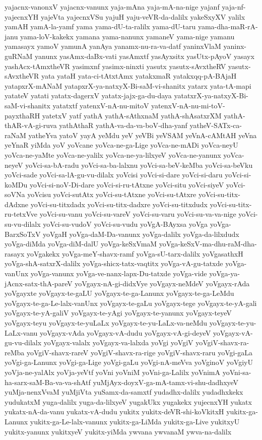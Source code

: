 {yajacnx-vanonxV
yajacnx-vanunx
yaja-mAna
yaja-mA-na-nige
yajanf
yaja-nf-yajecnxYH
yajeVta
yajecnxVSu
yajuH
yaju-veVR-da-dalilx
yakeSxyXV
yalilx
yamAH
yamA-la-yamf
yama
yama-dU-ta-ralilx
yama-dU-taru
yama-dha-maR-rA-janu
yama-loV-kakekx
yamana
yama-nanunx
yamaneV
yama-nige
yamanu
yamasayx
yamoV
yamunA
yanAya
yanamx-nu-ra-va-datf
yaninxVlaM
yaninx-guRNaM
yanunx
yasAmx-daBx-vati
yasAmxtf
yasAyxsitx
yasUtx-pAyoV
yasayx
yashAcx-tAmxtheVR
yasimxnf
yasimx-ninxti
yasutx
yasutx-sAvxtheRV
yasutx-sAvxtheVR
yata
yataH
yata-ci-tAtxtAmx
yatakxmaR
yatakxqq-pA-BAjaH
yatapxrX-mANaM
yatapxrX-ya-natxyX-Bi-saM-vi-shanitx
yatarx
yata-tA-mapi
yatateV
yatati
yatatx-dagerxV
yatatx-jajx-ga-du-daya
yatatxrX-ya-natxyX-Bi-saM-vi-shanitx
yatatxtf
yatenxV-nA-nu-mitoV
yatenxV-nA-nu-mi-toV-payxthaRH
yatetxV
yatf
yathA
yathA-sAthxnaM
yathA-shAsatxrXM
yathA-thAR-vA-gi-ruva
yathAthaR
yathA-va-da-va-boV-dha-yanf
yatheV-SATx-ca-raNaM
yatheYva
yatoV
yayA
yeMdu
yeV
yeVBi
yeVSAM
yeVnA-cAMtAH
yeVna
yeYnaR
yiMda
yoV
yoVcane
yoVca-ne-ga-Lige
yoVca-ne-mADi
yoVca-neyU
yoVca-ne-yaMte
yoVca-ne-yalilx
yoVca-ne-ya-lilxyeV
yoVca-ne-yanunx
yoVca-neyeV
yoVci-sa-bA-radu
yoVci-sa-ba-lalxnu
yoVci-sa-beV-keMba
yoVci-sa-beVku
yoVci-sade
yoVci-sa-lA-gu-vu-dilalx
yoVcisi
yoVci-si-dare
yoVci-si-daru
yoVci-si-koMDu
yoVci-si-noV-Di-dare
yoVci-si-ru-tAtxne
yoVci-situ
yoVci-siyeV
yoVci-soVNa
yoVcisu
yoVci-sutAtx
yoVci-su-tAtxne
yoVci-su-tAtxre
yoVci-su-titx-dAdxne
yoVci-su-titxdadx
yoVci-su-titx-dadxre
yoVci-su-titxdudx
yoVci-su-titx-ru-tetxVve
yoVci-su-vanu
yoVci-su-vareV
yoVci-su-varu
yoVci-su-va-va-nige
yoVci-su-vu-dilalx
yoVci-su-vudoV
yoVci-su-vudu
yoVgA-BAyxsa
yoVga
yoVga-BarxSoTxV
yoVgaH
yoVga-daM-Da-vanunx
yoVga-dalilx
yoVga-da-lilxdudx
yoVga-diMda
yoVga-diM-dalU
yoVga-keSxVmaM
yoVga-keSxV-ma-dhu-raM-dha-rasayx
yoVgakekx
yoVga-meY-shavx-ramf
yoVga-sU-tarx-dalilx
yoVgasathxH
yoVga-shA-satxrX-dalilx
yoVga-shicx-tatx-vaqtitx
yoVga-vA-gu-tatxde
yoVga-vanUnx
yoVga-vanunx
yoVga-ve-nanx-lapx-Du-tatxde
yoVga-vide
yoVga-ya-jAcnx-satx-thA-pareV
yoVgayx-nA-gi-didxVye
yoVgayx-neMdeV
yoVgayx-rAda
yoVgayxte
yoVgayx-te-gaLU
yoVgayx-te-ga-Lanunx
yoVgayx-te-ga-LeMdu
yoVgayx-te-ga-Le-lalx-vanUnx
yoVgayx-te-gaLu
yoVgayx-tege
yoVgayx-te-yA-gali
yoVgayx-te-yA-galiV
yoVgayx-te-yAgi
yoVgayx-te-yanunx
yoVgayx-teyeV
yoVgayx-teyu
yoVgayx-te-yuLaLx
yoVgayx-te-yu-LaLx-va-neMdu
yoVgayx-te-yu-LaLx-vanu
yoVgayx-vAda
yoVgayx-vA-dudu
yoVgayx-vA-gi-deyeV
yoVgayx-vA-gu-vu-dilalx
yoVgayx-valalx
yoVgayx-va-lalxda
yoVgi
yoVgiV
yoVgiV-shavx-ra-reMba
yoVgiV-shavx-rareV
yoVgiV-shavx-ra-rige
yoVgiV-shavx-raru
yoVgi-gaLa
yoVgi-ga-Lanunx
yoVgi-ga-Lige
yoVgi-gaLu
yoVgi-nA-meVva
yoVginoV
yoVgiyU
yoVja-ne-yalAlx
yoVja-yeVtf
yoVni
yoVniM
yoVni-ga-Lalilx
yoVnimA
yoVni-sa-ha-sarx-saM-Ba-va-va-shAtf
yuMjAyx-doyxV-ga-mA-tamx-vi-shu-dadhxyeV
yuMja-nenxVvaM
yuMjiVta
yuSamx-da-samxtf
yudadhx-dalilx
yudadhxkekx
yudukatxM
yuga-dalilx
yuga-da-lilxyeV
yugakUkx
yugakekx
yujecnxYH
yukatx
yukatx-nA-da-vanu
yukatx-vA-dudu
yukitx
yukitx-deVR-shi-koVkitxH
yukitx-ga-Lanunx
yukitx-ga-Le-lalx-vanunx
yukitx-ga-LiMda
yukitx-ga-Live
yukitxyU
yukitx-yanunx
yukitxyeV
yukitx-yiMda
ywvana
ywvanaM
ywva-na-dalilx
}
